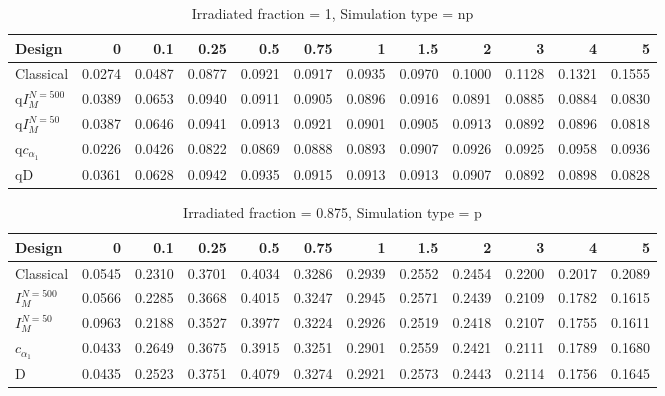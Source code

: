 \documentclass[a4paper]{article}
\begin{document}
\begin{table}[ht]
\centering
\begin{tabular}{lrrrrrrrrrrr}
  \hline
Design & 0 & 0.1 & 0.25 & 0.5 & 0.75 & 1 & 1.5 & 2 & 3 & 4 & 5 \\ 
  \hline
Classical & 0.0274 & 0.0487 & 0.0877 & 0.0921 & 0.0917 & 0.0935 & 0.0970 & 0.1000 & 0.1128 & 0.1321 & 0.1555 \\ 
  q$I_M^{N=500}$ & 0.0389 & 0.0653 & 0.0940 & 0.0911 & 0.0905 & 0.0896 & 0.0916 & 0.0891 & 0.0885 & 0.0884 & 0.0830 \\ 
  q$I_M^{N=50}$ & 0.0387 & 0.0646 & 0.0941 & 0.0913 & 0.0921 & 0.0901 & 0.0905 & 0.0913 & 0.0892 & 0.0896 & 0.0818 \\ 
  q$c_{\alpha_1}$ & 0.0226 & 0.0426 & 0.0822 & 0.0869 & 0.0888 & 0.0893 & 0.0907 & 0.0926 & 0.0925 & 0.0958 & 0.0936 \\ 
  qD & 0.0361 & 0.0628 & 0.0942 & 0.0935 & 0.0915 & 0.0913 & 0.0913 & 0.0907 & 0.0892 & 0.0898 & 0.0828 \\ 
   \hline
\end{tabular}
\caption{Irradiated fraction = 1, Simulation type = np} 
\end{table}

\begin{table}[ht]
\centering
\begin{tabular}{lrrrrrrrrrrr}
  \hline
Design & 0 & 0.1 & 0.25 & 0.5 & 0.75 & 1 & 1.5 & 2 & 3 & 4 & 5 \\ 
  \hline
Classical & 0.0545 & 0.2310 & 0.3701 & 0.4034 & 0.3286 & 0.2939 & 0.2552 & 0.2454 & 0.2200 & 0.2017 & 0.2089 \\ 
  $I_M^{N=500}$ & 0.0566 & 0.2285 & 0.3668 & 0.4015 & 0.3247 & 0.2945 & 0.2571 & 0.2439 & 0.2109 & 0.1782 & 0.1615 \\ 
  $I_M^{N=50}$ & 0.0963 & 0.2188 & 0.3527 & 0.3977 & 0.3224 & 0.2926 & 0.2519 & 0.2418 & 0.2107 & 0.1755 & 0.1611 \\ 
  $c_{\alpha_1}$ & 0.0433 & 0.2649 & 0.3675 & 0.3915 & 0.3251 & 0.2901 & 0.2559 & 0.2421 & 0.2111 & 0.1789 & 0.1680 \\ 
  D & 0.0435 & 0.2523 & 0.3751 & 0.4079 & 0.3274 & 0.2921 & 0.2573 & 0.2443 & 0.2114 & 0.1756 & 0.1645 \\ 
   \hline
\end{tabular}
\caption{Irradiated fraction = 0.875, Simulation type = p} 
\end{table}
\end{document}
